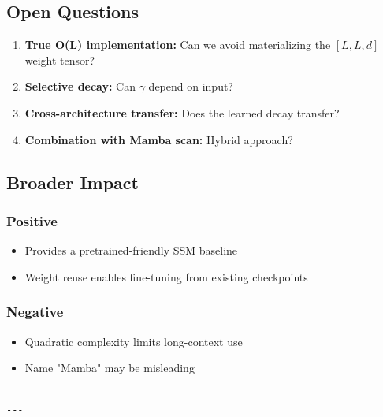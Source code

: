 \subsection{Open Questions}

\begin{enumerate}
\item \textbf{True O(L) implementation:} Can we avoid materializing the $[L, L, d]$
  weight tensor?
\item \textbf{Selective decay:} Can $\gamma$ depend on input?
\item \textbf{Cross-architecture transfer:} Does the learned decay transfer?
\item \textbf{Combination with Mamba scan:} Hybrid approach?

\end{enumerate}
\subsection{Broader Impact}

\subsubsection{Positive}
\begin{itemize}
\item Provides a pretrained-friendly SSM baseline
\item Weight reuse enables fine-tuning from existing checkpoints

\end{itemize}
\subsubsection{Negative}
\begin{itemize}
\item Quadratic complexity limits long-context use
\item Name "Mamba" may be misleading
\end{itemize}
\begin{lstlisting}

---
\end{lstlisting}